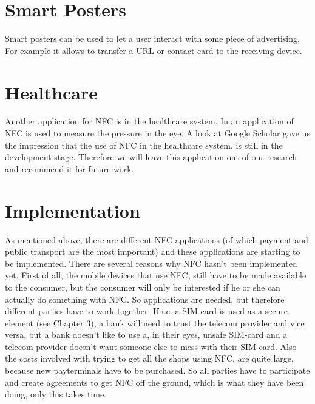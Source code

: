 \section{Smart Posters}
Smart posters can be used to let a user interact with some piece of advertising.
For example it allows to transfer a URL or contact card to the receiving device.

\section{Healthcare}
Another application for NFC is in the healthcare system.
In \cite{RFIDHB} an application of NFC is used to measure the pressure in the eye.
A look at Google Scholar gave us the impression that the use of NFC in the healthcare system, is still in the development stage.
Therefore we will leave this application out of our research and recommend it for future work. %


\section{Implementation} %
As mentioned above, there are different NFC applications (of which payment and public transport are the most important) and these applications are starting to be implemented. There are several reasons why NFC hasn't been implemented yet. First of all, the mobile devices that use NFC, still have to be made available to the consumer, but the consumer will only be interested if he or she can actually do something with NFC. So applications are needed, but therefore different parties have to work together. If i.e. a SIM-card is used as a secure element (see Chapter 3), a bank will need to trust the telecom provider and vice versa, but a bank doesn't like to use a, in their eyes, unsafe SIM-card and a telecom provider doesn't want someone else to mess with their SIM-card. Also the costs involved with trying to get all the shops using NFC, are quite large, because new payterminals have to be purchased.
So all parties have to participate and create agreements to get NFC off the ground, which is what they have been doing, only this takes time. %




